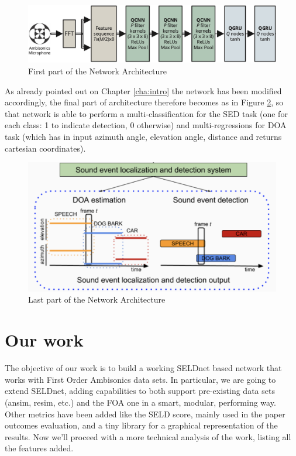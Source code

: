 \documentclass[11pt]{article}
\begin{document}
\begin{figure}[ht]
	\includegraphics[width=\linewidth]{img/arch1.png}
	\caption{First part of the Network Architecture}
	\label{fig:arch1}
\end{figure}

\noindent
As already pointed out on Chapter \ref{cha:intro} the network has been modified accordingly, the final part of architecture therefore becomes as in Figure \ref{fig:arch2}, so that network is able to perform a multi-classification for the SED task (one for each class: 1 to indicate detection, 0 otherwise) and multi-regressions for DOA task (which has in input azimuth angle, elevation angle, distance and returns cartesian coordinates).

\begin{figure}[ht]
	\centering
	\includegraphics[scale=0.5]{img/arch2.png}
	\caption{Last part of the Network Architecture}
	\label{fig:arch2}
\end{figure}

\newpage
\section{Our work}

The objective of our work is to build a working SELDnet based network that works with First Order Ambisonics data sets. In particular, we are going to extend SELDnet, adding capabilities to both support pre-existing data sets (ansim, resim, etc.) and the FOA one in a smart, modular, performing way. Other metrics have been added like the SELD score, mainly used in the paper \cite{paper2018} outcomes evaluation, and a tiny library for a graphical representation of the results. Now we'll proceed with a more technical analysis of the work, listing all the features added.
\end{document}
